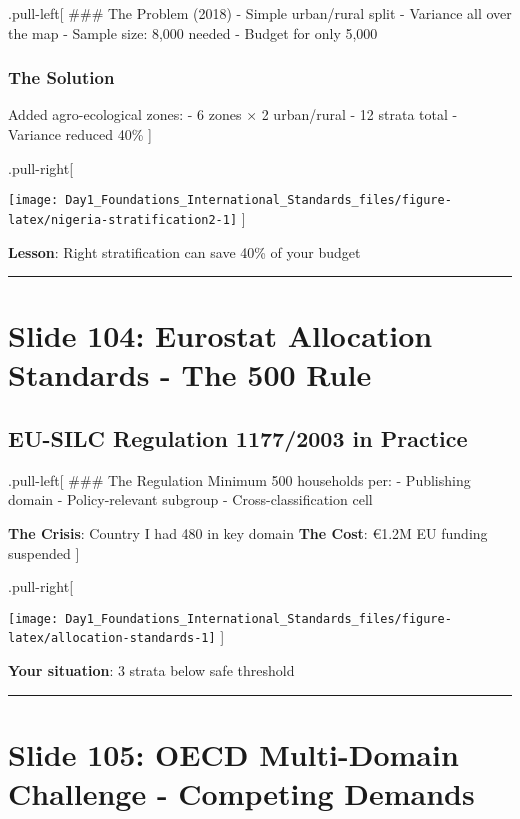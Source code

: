 \documentclass[
]{article}
\begin{document}
.pull-left{[} \#\#\# The Problem (2018) - Simple urban/rural split -
Variance all over the map - Sample size: 8,000 needed - Budget for only
5,000

\subsubsection{The Solution}\label{the-solution}

Added agro-ecological zones: - 6 zones × 2 urban/rural - 12 strata total
- Variance reduced 40\% {]}

.pull-right{[}

\texttt{[image: Day1\_Foundations\_International\_Standards\_files/figure-latex/nigeria-stratification2-1]}
{]}

\textbf{Lesson}: Right stratification can save 40\% of your budget

\begin{center}\rule{0.5\linewidth}{0.5pt}\end{center}

\section{Slide 104: Eurostat Allocation Standards - The 500
Rule}\label{slide-104-eurostat-allocation-standards---the-500-rule}

\subsection{EU-SILC Regulation 1177/2003 in
Practice}\label{eu-silc-regulation-11772003-in-practice}

.pull-left{[} \#\#\# The Regulation Minimum 500 households per: -
Publishing domain - Policy-relevant subgroup - Cross-classification cell

\textbf{The Crisis}: Country I had 480 in key domain \textbf{The Cost}:
€1.2M EU funding suspended {]}

.pull-right{[}

\texttt{[image: Day1\_Foundations\_International\_Standards\_files/figure-latex/allocation-standards-1]}
{]}

\textbf{Your situation}: 3 strata below safe threshold

\begin{center}\rule{0.5\linewidth}{0.5pt}\end{center}

\section{Slide 105: OECD Multi-Domain Challenge - Competing
Demands}\label{slide-105-oecd-multi-domain-challenge---competing-demands}
\end{document}
